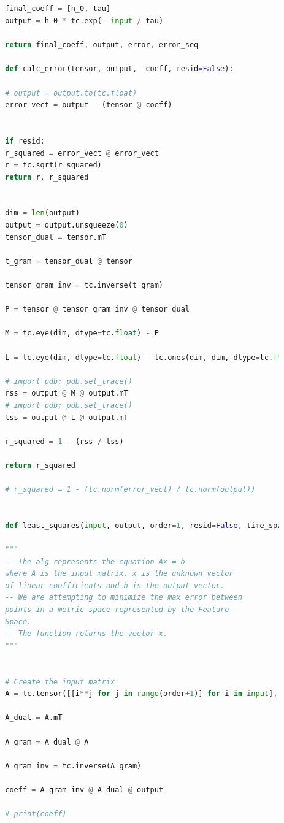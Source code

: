 \documentclass[]{report}
\begin{document}
\begin{lstlisting}[language=Python]
		
		
		
		
		final_coeff = [h_0, tau]
		output = h_0 * tc.exp(- input / tau)
		
		return final_coeff, output, error, error_seq
		
		def calc_error(tensor, output,  coeff, resid=False):
		
		# output = output.to(tc.float)
		error_vect = output - (tensor @ coeff)
		
		
		if resid:
		r_squared = error_vect @ error_vect
		r = tc.sqrt(r_squared)
		return r, r_squared
		
		
		dim = len(output)
		output = output.unsqueeze(0)
		tensor_dual = tensor.mT
		
		t_gram = tensor_dual @ tensor
		
		tensor_gram_inv = tc.inverse(t_gram)
		
		P = tensor @ tensor_gram_inv @ tensor_dual
		
		M = tc.eye(dim, dtype=tc.float) - P
		
		L = tc.eye(dim, dtype=tc.float) - tc.ones(dim, dim, dtype=tc.float) / dim
		
		# import pdb; pdb.set_trace()
		rss = output @ M @ output.mT
		# import pdb; pdb.set_trace()
		tss = output @ L @ output.mT
		
		r_squared = 1 - (rss / tss)
		
		return r_squared
		
		# r_squared = 1 - (tc.norm(error_vect) / tc.norm(output))
		
		
		def least_squares(input, output, order=1, resid=False, time_span=None):
		
		""" 
		-- The alg represents the equation Ax = b
		where A is the input matrix, x is the unknown vector
		of linear coefficients and b is the output vector.
		-- We are attempting to minimize the max error between
		points in a metric space represented by the Feature 
		Space.
		-- The function returns the vector x.
		"""
		
		
		# Create the input matrix
		A = tc.tensor([[i**j for j in range(order+1)] for i in input], dtype=tc.float)
		
		A_dual = A.mT
		
		A_gram = A_dual @ A
		
		A_gram_inv = tc.inverse(A_gram)
		
		coeff = A_gram_inv @ A_dual @ output
		
		# print(coeff)
		

\end{lstlisting}
\end{document}
